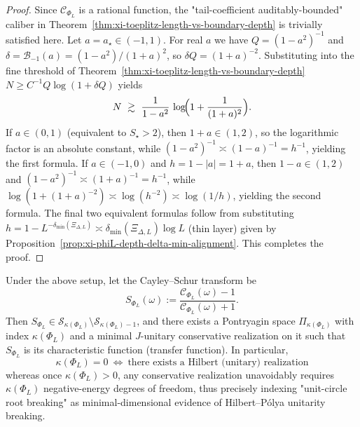 \begin{proof}
Since \(\mathscr{C}_{\Phi_L}\) is a rational function, the "tail-coefficient auditably-bounded" caliber in Theorem~\ref{thm:xi-toeplitz-length-vs-boundary-depth} is trivially satisfied here.
Let \(a=a_\star\in(-1,1)\).
For real \(a\) we have \(Q=(1-a^2)^{-1}\) and
\(
\delta=\mathcal{B}_{-1}(a)=(1-a^2)/(1+a)^2
\),
so \(\delta Q=(1+a)^{-2}\).
Substituting into the fine threshold of Theorem~\ref{thm:xi-toeplitz-length-vs-boundary-depth}
\(
N\ge C^{-1}Q\log(1+\delta Q)
\)
yields
\[
N\ \gtrsim\ \frac{1}{1-a^2}\,
\log\!\Bigl(1+\frac{1}{(1+a)^2}\Bigr).
\]
If \(a\in(0,1)\) (equivalent to \(S_\star>2\)), then \(1+a\in(1,2)\), so the logarithmic factor is an absolute constant, while \((1-a^2)^{-1}\asymp (1-a)^{-1}=h^{-1}\), yielding the first formula.
If \(a\in(-1,0)\) and \(h=1-|a|=1+a\), then \(1-a\in(1,2)\) and \((1-a^2)^{-1}\asymp (1+a)^{-1}=h^{-1}\), while \(\log(1+(1+a)^{-2})\asymp \log(h^{-2})\asymp \log(1/h)\), yielding the second formula.
The final two equivalent formulas follow from substituting \(h=1-L^{-\delta_{\min}(\Xi_{\Delta,L})}\asymp \delta_{\min}(\Xi_{\Delta,L})\log L\) (thin layer) given by Proposition~\ref{prop:xi-phiL-depth-delta-min-alignment}. This completes the proof.
\end{proof}

\begin{corollary}\label{cor:xi-phiL-pontryagin-realization-index}
Under the above setup, let the Cayley--Schur transform be
\[
S_{\Phi_L}(\omega):=\frac{\mathscr{C}_{\Phi_L}(\omega)-1}{\mathscr{C}_{\Phi_L}(\omega)+1}.
\]
Then \(S_{\Phi_L}\in\mathcal{S}_{\kappa(\Phi_L)}\setminus\mathcal{S}_{\kappa(\Phi_L)-1}\), and there exists a Pontryagin space \(\Pi_{\kappa(\Phi_L)}\) with index \(\kappa(\Phi_L)\) and a minimal \(J\)-unitary conservative realization on it such that \(S_{\Phi_L}\) is its characteristic function (transfer function).
In particular,
\[
\boxed{\;
\kappa(\Phi_L)=0\ \Longleftrightarrow\ \text{there exists a Hilbert (unitary) realization}\;}
\]
whereas once \(\kappa(\Phi_L)>0\), any conservative realization unavoidably requires \(\kappa(\Phi_L)\) negative-energy degrees of freedom, thus precisely indexing "unit-circle root breaking" as minimal-dimensional evidence of Hilbert--Pólya unitarity breaking.
\end{corollary}

